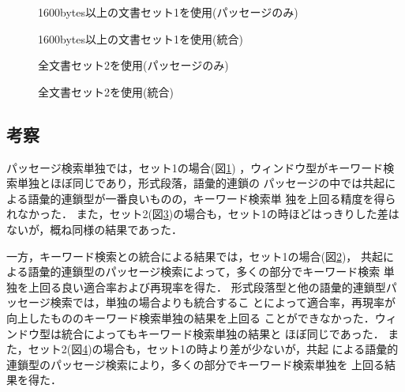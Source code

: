 \begin{figure}
\begin{center}
\caption{1600bytes以上の文書セット1を使用(パッセージのみ)}
\label{fig:ex5}
\end{center}
\end{figure}

\begin{figure}
\begin{center}
\caption{1600bytes以上の文書セット1を使用(統合)}
\label{fig:ex6}
\end{center}
\end{figure}

\begin{figure}
\begin{center}
\caption{全文書セット2を使用(パッセージのみ)}
\label{fig:ex7}
\end{center}
\end{figure}

\begin{figure}
\begin{center}
\caption{全文書セット2を使用(統合)}
\label{fig:ex8}
\end{center}
\end{figure}


\newpage
\subsection{考察}\label{subsec:kousatsu}
パッセージ検索単独では，セット1の場合(図\ref{fig:ex5})
，ウィンドウ型がキーワード検索単独とほぼ同じであり，形式段落，語彙的連鎖の
パッセージの中では共起による語彙的連鎖型が一番良いものの，キーワード検索単
独を上回る精度を得られなかった．
また，セット2(図\ref{fig:ex7})の場合も，セット1の時ほどはっきりした差は
ないが，概ね同様の結果であった．

一方，キーワード検索との統合による結果では，セット1の場合(図\ref{fig:ex6})，
共起による語彙的連鎖型のパッセージ検索によって，多くの部分でキーワード検索
単独を上回る良い適合率および再現率を得た．
形式段落型と他の語彙的連鎖型パッセージ検索では，単独の場合よりも統合するこ
とによって適合率，再現率が向上したもののキーワード検索単独の結果を上回る
ことができなかった．ウィンドウ型は統合によってもキーワード検索単独の結果と
ほぼ同じであった．
また，セット2(図\ref{fig:ex8})の場合も，セット1の時より差が少ないが，共起
による語彙的連鎖型のパッセージ検索により，多くの部分でキーワード検索単独を
上回る結果を得た．

